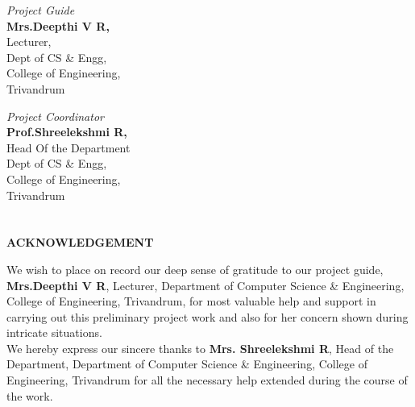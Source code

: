 \documentclass[pdftex,12pt,a4paper,pdfencoding=unicode]{article}
\begin{document}
\begin{onehalfspace}
      \begin{minipage}{0.4\textwidth}
        \begin{flushleft}
          {
            \small \emph{Project Guide}\\
                   {\bf Mrs.Deepthi V R,}\\
                   Lecturer,\\
                   Dept of CS \& Engg,\\
                   College of Engineering,\\Trivandrum
          }
        \end{flushleft}
      \end{minipage}
      \begin{minipage}{0.4\textwidth}
        \begin{flushright}
          {
            \small
            \emph{Project Coordinator}\\
                 {\bf Prof.Shreelekshmi R,}\\
                 Head Of the Department\\
                 Dept of CS \& Engg,\\
                 College of Engineering,\\Trivandrum
          }
        \end{flushright}
      \end{minipage}
      \vfill
      \newpage
      \section*{}
      \thispagestyle{empty}
      \begin{center}
        {\bf ACKNOWLEDGEMENT}
      \end{center}
      We wish to place on record our deep sense of gratitude to our project guide, {\bf Mrs.Deepthi V R}, Lecturer, Department
      of Computer Science \& Engineering, College of Engineering, Trivandrum, for most valuable help and support in carrying out this
      preliminary project work and also for her concern shown during intricate situations.\\

      \indent We hereby express our sincere thanks to {\bf Mrs. Shreelekshmi R}, Head of the Department, Department of Computer
      Science \& Engineering, College of Engineering, Trivandrum for all the necessary help extended during the course of the work.\\


\end{onehalfspace}
\end{document}
